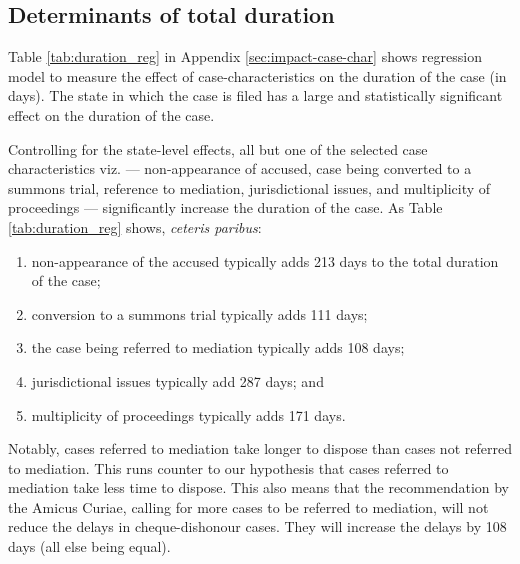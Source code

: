\subsection{Determinants of total duration}
\label{sec:determ-total-durat}

Table \ref{tab:duration_reg} in Appendix \ref{sec:impact-case-char} shows regression model to measure the effect of case-characteristics on the duration of the case (in days). The state in which the case is filed has a large and statistically significant effect on the duration of the case.

Controlling for the state-level effects, all but one of the selected case characteristics viz. --- non-appearance of accused, case being converted to a summons trial, reference to mediation, jurisdictional issues, and multiplicity of proceedings --- significantly increase the duration of the case. As Table \ref{tab:duration_reg} shows, \emph{ceteris paribus}:
\begin{enumerate}
\item non-appearance of the accused typically adds 213 days to the total duration of the case;
\item conversion to a summons trial typically adds 111 days;
\item the case being referred to mediation typically adds 108 days;
\item jurisdictional issues typically add 287 days; and
\item multiplicity of proceedings typically adds 171 days.
\end{enumerate}

Notably, cases referred to mediation take longer to dispose than cases not referred to mediation. This runs counter to our hypothesis that cases referred to mediation take less time to dispose. This also means that the recommendation by the Amicus Curiae, calling for more cases to be referred to mediation, will not reduce the delays in cheque-dishonour cases. They will increase the delays by 108 days (all else being equal).

